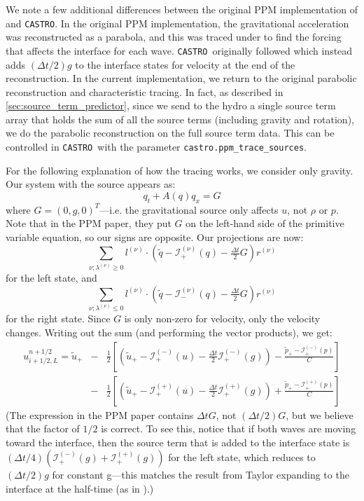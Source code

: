 \documentclass[iop,numberedappendix]{../emulateapj}
\newcommand{\evm}{{(-)}}
\newcommand{\evp}{{(+)}}
\newcommand{\enu}{{(\nu)}}
\newcommand{\castro}{\texttt{CASTRO}}
\begin{document}
We note a few additional differences between the original PPM
implementation of \citet{ppm} and \castro.  In the original PPM
implementation, the gravitational acceleration was reconstructed as a parabola, and
this was traced under to find the forcing that affects the interface
for each wave.  \castro\ originally followed \citet{ppmunsplit} which instead adds
$(\Delta t/2)g$ to the interface states for velocity at the end of the
reconstruction.  In the current implementation, we return to the original
parabolic reconstruction and characteristic tracing. In fact, as described 
in \autoref{sec:source_term_predictor}, since we send to the hydro a single 
source term array that holds the sum of all the source terms (including gravity 
and rotation), we do the parabolic reconstruction on the full source term data. 
This can be controlled in \castro\ with the parameter {\tt castro.ppm\_trace\_sources}. 

For the following explanation of how the tracing works, we consider only gravity.
Our system with the source appears as:
\begin{equation}
q_t + A(q) q_x = G
\end{equation}
where $G = (0, g, 0)^T$---i.e. the gravitational source only affects
$u$, not $\rho$ or $p$.  Note that in the PPM paper, they put $G$ on 
the left-hand side of the primitive variable equation, so our signs are
opposite.  Our projections are now:
\begin{equation}
\sum_{\nu; \lambda^\enu \ge 0}l^\enu \cdot (\tilde{q} - \mathcal{I}^\enu_+(q) - \tfrac{\Delta t}{2} G) r^\enu
\end{equation}
for the left state, and
\begin{equation}
\sum_{\nu; \lambda^\enu \le 0} l^\enu \cdot (\tilde{q} - \mathcal{I}^\enu_-(q) - \tfrac{\Delta t}{2} G) r^\enu 
\end{equation}
for the right state.  Since $G$ is only non-zero for velocity, only
the velocity changes.  Writing out the sum (and performing the vector products), we
get:
\begin{eqnarray}
u_{i+1/2,L}^{n+1/2} =
   \tilde{u}_+ 
  &-& \frac{1}{2} \left [
      \left (\tilde{u}_+ - \mathcal{I}_+^\evm(u) - \frac{\Delta t}{2} \mathcal{I}^\evm_+(g) \right ) - 
       \frac{\tilde{p}_+ - \mathcal{I}_+^\evm(p)}{C} \right ] \nonumber \\
  &-& \frac{1}{2} \left [
      \left (\tilde{u}_+ - \mathcal{I}_+^\evp(u) - \frac{\Delta t}{2} \mathcal{I}^\evp_+(g) \right ) +
       \frac{\tilde{p}_+ - \mathcal{I}_+^\evp(p)}{C} \right ]
\end{eqnarray}
(The expression in the PPM paper contains $\Delta t G$, not $(\Delta t/2) G$,
but we believe that the factor of $1/2$ is correct.  To see this, notice that if both
waves are moving toward the interface, then the source term that is
added to the interface state is $(\Delta t/4) (\mathcal{I}_+^\evm(g) +
\mathcal{I}_+^\evp(g))$ for the left state, which reduces to $(\Delta
t/2) g$ for constant g---this matches the result from Taylor
expanding to the interface at the half-time (as in \citealt{ppmunsplit}).)
\end{document}
